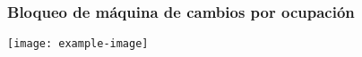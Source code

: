 \subsubsection{Bloqueo de máquina de cambios por ocupación}

\lipsum[1]
\texttt{[image: example-image]}
\lipsum[1]